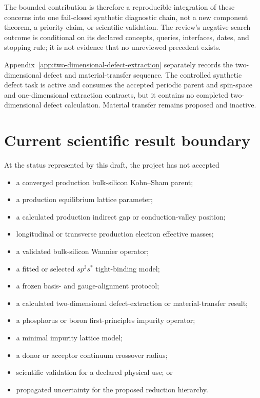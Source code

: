 The bounded contribution is therefore a reproducible integration of these
concerns into one fail-closed synthetic diagnostic chain, not a new component
theorem, a priority claim, or scientific validation. The review's negative
search outcome is conditional on its declared concepts, queries, interfaces,
dates, and stopping rule; it is not evidence that no unreviewed precedent
exists.

Appendix~\ref{app:two-dimensional-defect-extraction} separately records the
two-dimensional defect and material-transfer sequence. The controlled synthetic
defect task is active and consumes the accepted periodic parent and spin-space
and one-dimensional extraction contracts, but it contains no completed
two-dimensional defect calculation. Material transfer remains proposed and
inactive.

\section{Current scientific result boundary}


At the status represented by this draft, the project has not accepted

\begin{itemize}
  \item a converged production bulk-silicon Kohn--Sham parent;
  \item a production equilibrium lattice parameter;
  \item a calculated production indirect gap or conduction-valley position;
  \item longitudinal or transverse production electron effective masses;
  \item a validated bulk-silicon Wannier operator;
  \item a fitted or selected $sp^3s^{\ast}$ tight-binding model;
  \item a frozen basis- and gauge-alignment protocol;
  \item a calculated two-dimensional defect-extraction or material-transfer
    result;
  \item a phosphorus or boron first-principles impurity operator;
  \item a minimal impurity lattice model;
  \item a donor or acceptor continuum crossover radius;
  \item scientific validation for a declared physical use; or
  \item propagated uncertainty for the proposed reduction hierarchy.
\end{itemize}

